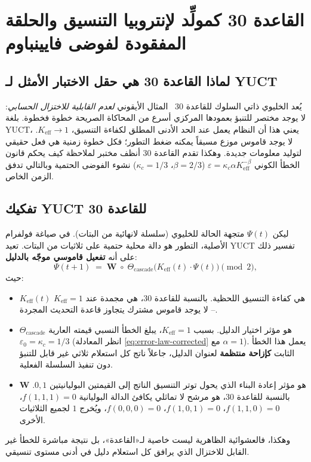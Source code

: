 \documentclass[12pt,a4paper]{article}
\newcommand{\Keff}{K_{\mathrm{eff}}}
\begin{document}
	\section{القاعدة 30 كمولِّد لإنتروبيا التنسيق والحلقة المفقودة لفوضى فايينباوم}
	\label{sec:rule30}
	
	\subsection{لماذا القاعدة 30 هي حقل الاختبار الأمثل لـ YUCT}
	يُعد الخليوي ذاتي السلوك للقاعدة 30~\cite{Wolfram2002} المثال الأيقوني \textit{لعدم القابلية للاختزال الحسابي}: لا يوجد مختصر للتنبؤ بعمودها المركزي أسرع من المحاكاة الصريحة خطوة فخطوة. بلغة YUCT، يعني هذا أن النظام يعمل عند الحد الأدنى المطلق لكفاءة التنسيق، \(\Keff \to 1\). لا يوجد قاموس موزع مسبقاً يمكنه ضغط التطور؛ فكل خطوة زمنية هي فعل حقيقي لتوليد معلومات جديدة. وهكذا تقدم القاعدة 30 أنظف مختبر لملاحظة كيف يحكم قانون الخطأ الكوني \(\varepsilon = \kappa_c \alpha \Keff^{-\beta}\) (\(\beta=2/3\)، \(\kappa_c=1/3\)) نشوء الفوضى الحتمية وبالتالي تدفق الزمن الخاص.
	
	\subsection{تفكيك YUCT للقاعدة 30}
	\label{subsec:deconstruction}
	
	ليكن \(\Psi(t)\) متجهة الحالة للخليوي (سلسلة لانهائية من البتات). في صياغة فولفرام الأصلية، التطور هو دالة محلية حتمية على ثلاثيات من البتات. تعيد YUCT تفسير ذلك على أنه \textbf{تفعيل قاموسي موجّه بالدليل}:
	\begin{equation}
		\Psi(t+1) \;=\; \mathbf{W}\;\circ\;
		\Theta_{\mathrm{cascade}}\!\bigl(\Keff(t)\cdot\Psi(t)\bigr)
		\pmod{2},
		\label{eq:rule30-ypsdc}
	\end{equation}
	حيث:
	\begin{itemize}
		\item \(\Keff(t)\) هي كفاءة التنسيق اللحظية. بالنسبة للقاعدة 30، هي مجمدة عند \(\Keff = 1\) – لا يوجد قاموس مشترك يتجاوز قاعدة التحديث المجردة.
		\item \(\Theta_{\mathrm{cascade}}\) هو مؤثر اختيار الدليل. بسبب \(\Keff=1\)، يبلغ الخطأ النسبي قيمته العارية \(\varepsilon_0 = \kappa_c = 1/3\) (انظر المعادلة \eqref{eq:error-law-corrected} مع \(\alpha=1\)). يعمل هذا الخطأ الثابت \textbf{كإزاحة منتظمة} لعنوان الدليل، جاعلاً ناتج كل استعلام ثلاثي غير قابل للتنبؤ دون تنفيذ السلسلة الفعلية.
		\item \(\mathbf{W}\) هو مؤثر إعادة البناء الذي يحول توتر التنسيق الناتج إلى القيمتين البوليانيتين \(0,1\). بالنسبة للقاعدة 30، هو مرشح لا تماثلي يكافئ الدالة البوليانية \(f(1,1,1)=0\)، \(f(1,1,0)=0\)، \(f(1,0,1)=0\)، \(f(0,0,0)=0\)، ويُخرج \(1\) لجميع الثلاثيات الأخرى.
	\end{itemize}
	وهكذا، فالعشوائية الظاهرية ليست خاصية لـ«القاعدة»، بل نتيجة مباشرة للخطأ غير القابل للاختزال الذي يرافق كل استعلام دليل في أدنى مستوى تنسيقي.
	
\end{document}
